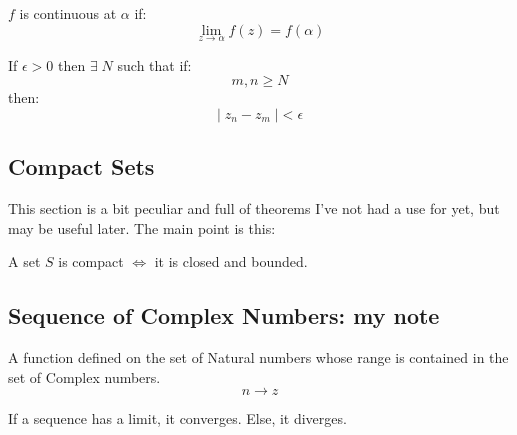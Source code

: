\begin{defn}
	$f$ is continuous at $\alpha$ if:
	\[ \lim_{z \to \alpha} f(z) = f(\alpha) \]
\end{defn} 

\begin{defn}
	If $\epsilon > 0$ then $\exists \; N$ such that if:
	\[ m, n \geq N \]
	then:
	\[| \; {z}_{n} - {z}_{m} \; | < \epsilon \]
\end{defn}

\subsection{Compact Sets}
This section is a bit peculiar and full of theorems I've not had a use for yet, but may be useful later. The main point is this:
\begin{thm}
	A set $S$ is compact $\iff$ it is closed and bounded.
\end{thm}

\subsection{Sequence of Complex Numbers: my note}

\begin{defn}
	A function defined on the set of Natural numbers whose 
	range is contained in the set of Complex numbers.
	\[n \to z\]
\end{defn}

If a sequence has a limit, it converges. Else, it diverges.

